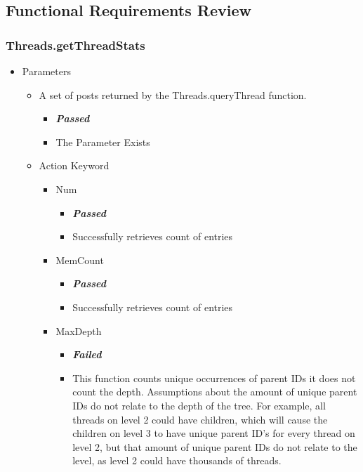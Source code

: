 \subsection{Functional Requirements Review}
\subsubsection{Threads.getThreadStats}

\begin{itemize}
	\item Parameters
		\begin{itemize}
			\item A set of posts returned by the Threads.queryThread function.
			\begin{itemize}
				\item \color{green}
\textbf{\small \emph{Passed}} \\
				\color{black} \item The Parameter Exists
			\end{itemize}
			\item Action Keyword 
			\begin{itemize}
				\item Num
				\begin{itemize}
					\item \color{green}
\textbf{\small \emph{Passed}} \\\color{black}
					\item Successfully retrieves count of entries
				\end{itemize}
				\item MemCount
				\begin{itemize}
					\item \color{green}
\textbf{\small \emph{Passed}} \\ \color{black}
					\item Successfully retrieves count of entries
				\end{itemize}
				\item MaxDepth
				\begin{itemize}
					\item \color{red}
\textbf{\small \emph{Failed}} \\\color{black}
					\item This function counts unique occurrences of parent IDs \textsc{} it does not count the depth. Assumptions about the amount of unique parent IDs do not relate to the depth of the tree. For example, all threads on level 2 could have children, which will cause the children on level 3 to have unique parent ID’s for every thread on level 2, but that amount of unique parent IDs do not relate to the level, as level 2 could have thousands of threads.

\end{itemize}
\end{itemize}
\end{itemize}
\end{itemize}
